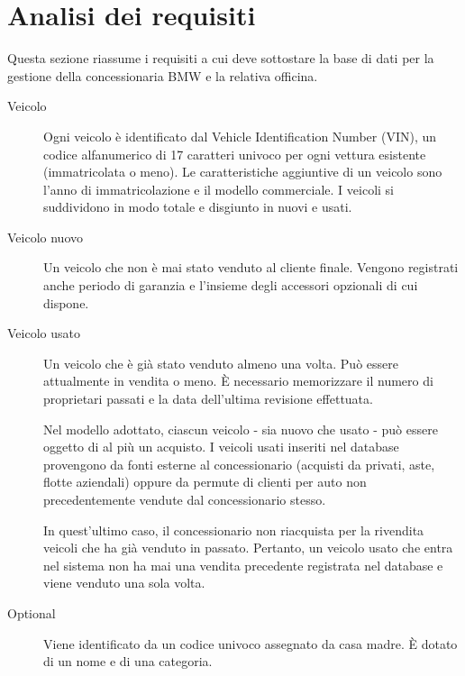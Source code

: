 \section{Analisi dei requisiti}

Questa sezione riassume i requisiti a cui deve sottostare la base di dati per la
gestione della concessionaria BMW e la relativa officina.

\begin{description}

    \item[Veicolo] Ogni veicolo è identificato dal Vehicle Identification Number (VIN),
    un codice alfanumerico di 17 caratteri univoco per ogni vettura esistente (immatricolata o meno).
    Le caratteristiche aggiuntive di un veicolo sono l'anno di immatricolazione e il modello commerciale.
    I veicoli si suddividono in modo totale e disgiunto in nuovi e usati.

    \item[Veicolo nuovo] Un veicolo che non è mai stato venduto al cliente finale. Vengono
    registrati anche periodo di garanzia e l'insieme degli accessori opzionali di cui dispone.

    \item[Veicolo usato] Un veicolo che è già stato venduto almeno una volta. Può essere attualmente in vendita o meno.
    È necessario memorizzare il numero di proprietari passati e la data dell'ultima revisione effettuata.

    Nel modello adottato, ciascun veicolo - sia nuovo che usato - può essere oggetto di al più un acquisto. I veicoli usati inseriti nel database
    provengono da fonti esterne al concessionario (acquisti da privati, aste, flotte aziendali) oppure da permute di clienti per auto non precedentemente
    vendute dal concessionario stesso.
    
    In quest'ultimo caso, il concessionario non riacquista per la rivendita veicoli che ha già venduto in passato.
    Pertanto, un veicolo usato che entra nel sistema non ha mai una vendita precedente registrata nel database 
    e viene venduto una sola volta.

    \item[Optional] Viene identificato da un codice univoco assegnato da casa madre.
    È dotato di un nome e di una categoria.


\end{description}
